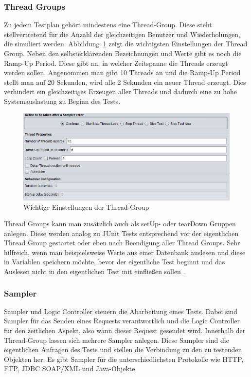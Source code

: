 \documentclass[a4paper,12pt]{article}
\begin{document}
\subsubsection{Thread Groups}
Zu jedem Testplan gehört mindestens eine Thread-Group. Diese steht stellvertretend für die Anzahl der gleichzeitigen Benutzer und Wiederholungen, die simuliert werden. Abbildung~\ref{fig:thread_group} zeigt die wichtigsten Einstellungen der Thread Group. Neben den selbsterklärenden Bezeichnungen und Werte gibt es noch die Ramp-Up Period. Diese gibt an, in welcher Zeitspanne die Threads erzeugt werden sollen.
Angenommen man gibt 10 Threads an und die Ramp-Up Period stellt man auf 20 Sekunden, wird alle 2 Sekunden ein neuer Thread erzeugt. Dies verhindert ein gleichzeitiges Erzeugen aller Threads und dadurch eine zu hohe Systemauslastung zu Beginn des Tests.

\begin{figure}[htb]%
 \centering
    \includegraphics[width=1\textwidth]{bilder/thread_group.png}
  \caption{Wichtige Einstellungen der Thread-Group}
  \label{fig:thread_group}
\end{figure}

Thread Groups kann man zusätzlich auch als setUp- oder tearDown Gruppen anlegen. Diese werden analog zu JUnit Tests entsprechend vor der eigentlichen Thread Group gestartet oder eben nach Beendigung aller Thread Groups. Sehr hilfreich, wenn man beispielsweise Werte aus einer Datenbank auslesen und diese in Variablen speichern möchte, bevor der eigentliche Test beginnt und das Auslesen nicht in den eigentlichen Test mit einfließen sollen \cite{online:testingJournals}.

\subsubsection{Sampler}
Sampler und Logic Controller steuern die Abarbeitung eines Tests. Dabei sind Sampler für das Senden eines Requests verantwortlich und die Logic Controller für den zeitlichen Aspekt, also wann dieser Request gesendet wird. Innerhalb der Thread-Group lassen sich mehrere Sampler anlegen. Diese Sampler sind die eigentlichen Anfragen des Tests und stellen die Verbindung zu den zu testenden Objekten her. Es gibt Sampler für die unterschiedlichsten Protokolle wie HTTP, FTP, JDBC SOAP/XML und Java-Objekte. 
\end{document}
